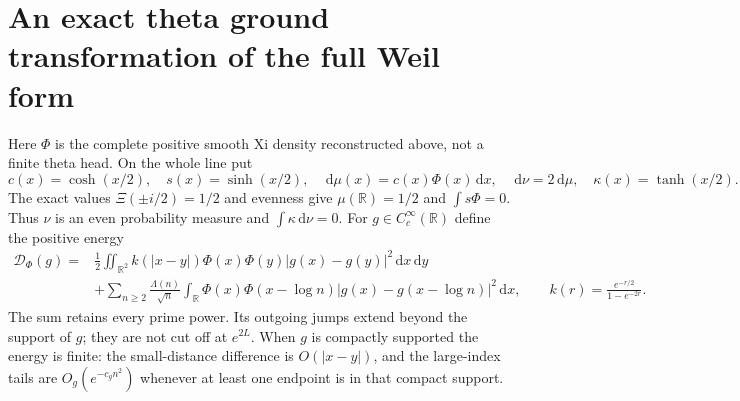 \documentclass[11pt]{article}
\theoremstyle{remark}\newtheorem{remark}[theorem]{Remark}
\newcommand{\R}{\mathbb R}
\newcommand{\dd}{\,\mathrm d}
\begin{document}
\section{An exact theta ground transformation of the full Weil form}
Here $\Phi$ is the complete positive smooth Xi density reconstructed
above, not a finite theta head. On the whole line put
\[
 c(x)=\cosh(x/2),\quad s(x)=\sinh(x/2),\quad
 \dd\mu(x)=c(x)\Phi(x)\dd x,\quad
 \dd\nu=2\dd\mu,\quad \kappa(x)=\tanh(x/2).
\]
The exact values $\Xi(\pm i/2)=1/2$ and evenness give
$\mu(\R)=1/2$ and $\int s\Phi=0$.
Thus $\nu$ is an even probability measure and
$\int\kappa\dd\nu=0$.
For $g\in C_c^\infty(\R)$ define the positive energy
\[
 \begin{split}
 \mathcal D_\Phi(g)={}&\frac12\iint_{\R^2}
       k(|x-y|)\Phi(x)\Phi(y)|g(x)-g(y)|^2\dd x\dd y\\
 &+\sum_{n\ge2}\frac{\Lambda(n)}{\sqrt n}
       \int_\R\Phi(x)\Phi(x-\log n)
                    |g(x)-g(x-\log n)|^2\dd x,\qquad
 k(r)=\frac{e^{-r/2}}{1-e^{-2r}}.
 \end{split}                                                 \tag{DPE}
\]
The sum retains every prime power. Its outgoing jumps extend
beyond the support of $g$; they are not cut off at $e^{2L}$.
When $g$ is compactly supported the energy is finite:
the small-distance difference is $O(|x-y|)$, and the
large-index tails are $O_g(e^{-c_gn^2})$ whenever at least
one endpoint is in that compact support.
\end{document}
